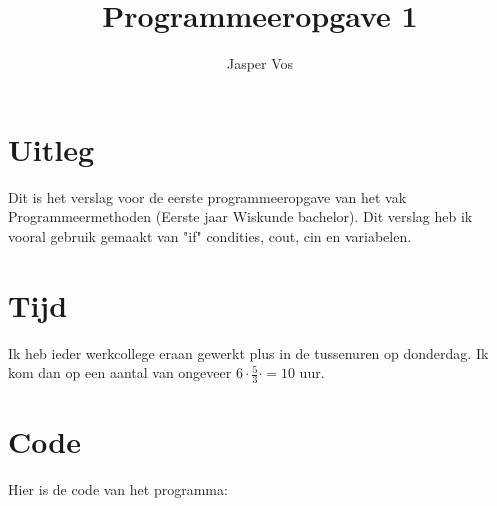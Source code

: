 \documentclass[10pt]{article}
\title{Programmeeropgave 1}
\author{Jasper Vos}
\begin{document}

\maketitle

\section{Uitleg}
Dit is het verslag voor de eerste programmeeropgave van het vak Programmeermethoden (Eerste jaar Wiskunde bachelor).
Dit verslag heb ik vooral gebruik gemaakt van "if" condities, cout, cin en variabelen.

\section{Tijd}
Ik heb ieder werkcollege eraan gewerkt plus in de tussenuren op donderdag. 
Ik kom dan op een aantal van ongeveer $6\cdot\frac{5}{3} \cdot  = 10$ uur.

\section*{Code}
Hier is de code van het programma:


\end{document}
